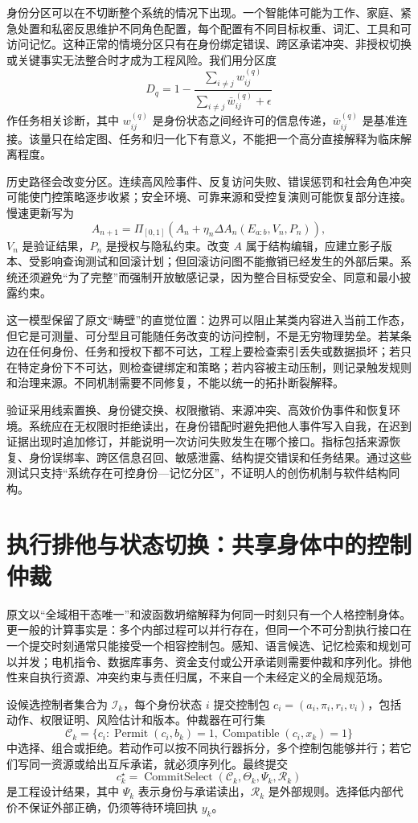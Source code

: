 身份分区可以在不切断整个系统的情况下出现。一个智能体可能为工作、家庭、紧急处置和私密反思维护不同角色配置，每个配置有不同目标权重、词汇、工具和可访问记忆。这种正常的情境分区只有在身份绑定错误、跨区承诺冲突、非授权切换或关键事实无法整合时才成为工程风险。我们用分区度
\[
D_q=1-\frac{\sum_{i\ne j}w_{ij}^{(q)}}
{\sum_{i\ne j}\bar w_{ij}^{(q)}+\epsilon}
\]
作任务相关诊断，其中 $w_{ij}^{(q)}$ 是身份状态之间经许可的信息传递，$\bar w_{ij}^{(q)}$ 是基准连接。该量只在给定图、任务和归一化下有意义，不能把一个高分直接解释为临床解离程度。

历史路径会改变分区。连续高风险事件、反复访问失败、错误惩罚和社会角色冲突可能使门控策略逐步收紧；安全环境、可靠来源和受控复演则可能恢复部分连接。慢速更新写为
\[
A_{n+1}=\Pi_{[0,1]}\!\left(A_n+\eta_n\Delta A_n(E_{a:b},V_n,P_n)\right),
\]
$V_n$ 是验证结果，$P_n$ 是授权与隐私约束。改变 $A$ 属于结构编辑，应建立影子版本、受影响查询测试和回滚计划；但回滚访问图不能撤销已经发生的外部后果。系统还须避免“为了完整”而强制开放敏感记录，因为整合目标受安全、同意和最小披露约束。

这一模型保留了原文“畴壁”的直觉位置：边界可以阻止某类内容进入当前工作态，但它是可测量、可分型且可能随任务改变的访问控制，不是无穷物理势垒。若某条边在任何身份、任务和授权下都不可达，工程上要检查索引丢失或数据损坏；若只在特定身份下不可达，则检查键绑定和策略；若内容被主动压制，则记录触发规则和治理来源。不同机制需要不同修复，不能以统一的拓扑断裂解释。

验证采用线索置换、身份键交换、权限撤销、来源冲突、高效价伪事件和恢复环境。系统应在无权限时拒绝读出，在身份错配时避免把他人事件写入自我，在迟到证据出现时追加修订，并能说明一次访问失败发生在哪个接口。指标包括来源恢复、身份误绑率、跨区信息召回、敏感泄露、结构提交错误和任务结果。通过这些测试只支持“系统存在可控身份—记忆分区”，不证明人的创伤机制与软件结构同构。

\section{执行排他与状态切换：共享身体中的控制仲裁}
\label{sec:exclusivity_principle}
原文以“全域相干态唯一”和波函数坍缩解释为何同一时刻只有一个人格控制身体。更一般的计算事实是：多个内部过程可以并行存在，但同一个不可分割执行接口在一个提交时刻通常只能接受一个相容控制包。感知、语言候选、记忆检索和规划可以并发；电机指令、数据库事务、资金支付或公开承诺则需要仲裁和序列化。排他性来自执行资源、冲突约束与责任归属，不来自一个未经定义的全局规范场。

设候选控制者集合为 $\mathcal I_k$，每个身份状态 $i$ 提交控制包 $c_i=(a_i,\pi_i,r_i,v_i)$，包括动作、权限证明、风险估计和版本。仲裁器在可行集
\[
\mathcal C_k=\{c_i:\operatorname{Permit}(c_i,b_k)=1,
\operatorname{Compatible}(c_i,x_k)=1\}
\]
中选择、组合或拒绝。若动作可以按不同执行器拆分，多个控制包能够并行；若它们写同一资源或给出互斥承诺，就必须序列化。最终提交
\[
c_k^\star=\operatorname{CommitSelect}
(\mathcal C_k,\Theta_k,\Psi_k,\mathcal R_k)
\]
是工程设计结果，其中 $\Psi_k$ 表示身份与承诺读出，$\mathcal R_k$ 是外部规则。选择低内部代价不保证外部正确，仍须等待环境回执 $y_k$。

